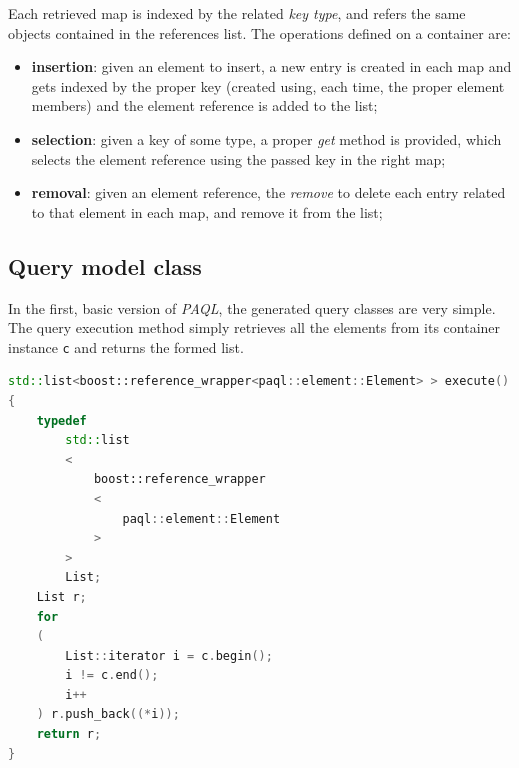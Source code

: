 \documentclass[10pt]{article}  %
\begin{document}
        Each retrieved map is indexed by the related \emph{key type}, and refers the same objects contained
        in the references list.
        The operations defined on a container are:
        \begin{itemize}
            \item \textbf{insertion}: given an element to insert, a new entry is created in each map and gets indexed by
            the proper key (created using, each time, the proper element members) and the element reference is added to the list;
            \item \textbf{selection}: given a key of some type, a proper \emph{get} method is provided,
            which selects the element reference using the passed key in the right map;
            \item \textbf{removal}: given an element reference, the \emph{remove} to delete each entry
            related to that element in each map, and remove it from the list;
        \end{itemize}
    \subsection{Query model class}
        In the first, basic version of \emph{PAQL}, the generated query classes are very simple. The query execution
        method simply retrieves all the elements from its container instance \texttt{c} and returns the formed list.
        \begin{lstlisting}[language=C++]
std::list<boost::reference_wrapper<paql::element::Element> > execute()
{
    typedef
        std::list
        <
            boost::reference_wrapper
            <
                paql::element::Element
            >
        >
        List;
    List r;
    for
    (
        List::iterator i = c.begin();
        i != c.end();
        i++
    ) r.push_back((*i));
    return r;
}
        \end{lstlisting}
\end{document}
